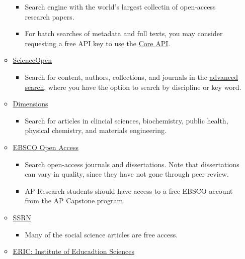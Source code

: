 \documentclass[]{book}
\providecommand{\tightlist}{%
  \setlength{\itemsep}{0pt}\setlength{\parskip}{0pt}}
\begin{document}
\begin{itemize}
\begin{itemize}
    \begin{itemize}
    \tightlist
    \item
      Search engine with the world's largest collectin of open-access research papers.
    \item
      For batch searches of metadata and full texts, you may consider requesting a free API key to use the \href{https://core.ac.uk/services/api/}{Core API}.
    \end{itemize}
  \item
    \href{https://www.scienceopen.com}{ScienceOpen}

    \begin{itemize}
    \tightlist
    \item
      Search for content, authors, collections, and journals in the \href{https://www.scienceopen.com/search\#advanced}{advanced search}, where you have the option to search by discipline or key word.
    \end{itemize}
  \item
    \href{https://app.dimensions.ai/discover/publication}{Dimensions}

    \begin{itemize}
    \tightlist
    \item
      Search for articles in clincial sciences, biochemistry, public health, physical chemistry, and materials engineering.
    \end{itemize}
  \item
    \href{https://www.ebsco.com/open-access}{EBSCO Open Access}

    \begin{itemize}
    \tightlist
    \item
      Search open-access journals and dissertations. Note that dissertations can vary in quality, since they have not gone through peer review.
    \item
      AP Research students should have access to a free EBSCO account from the AP Capstone program.
    \end{itemize}
  \item
    \href{https://papers.ssrn.com/sol3/DisplayJournalBrowse.cfm}{SSRN}

    \begin{itemize}
    \tightlist
    \item
      Many of the social science articles are free access.
    \end{itemize}
  \item
    \href{https://eric.ed.gov/}{ERIC: Institute of Educadtion Sciences}


\end{itemize}
\end{itemize}
\end{document}
